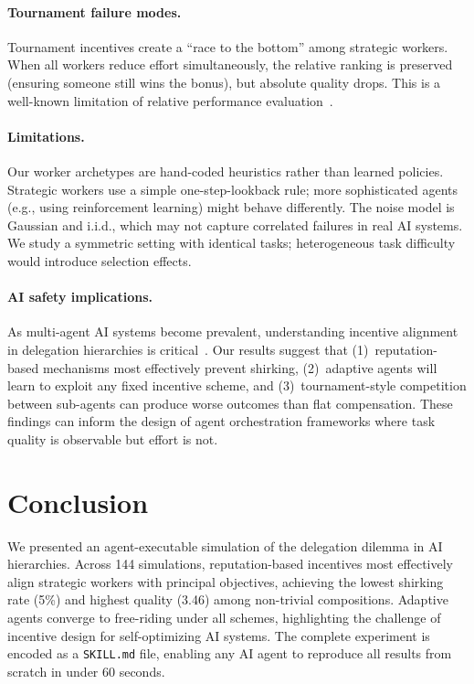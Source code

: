 \documentclass[11pt]{article}
\begin{document}
\paragraph{Tournament failure modes.}
Tournament incentives create a ``race to the bottom'' among strategic workers.
When all workers reduce effort simultaneously, the relative ranking is preserved (ensuring someone still wins the bonus), but absolute quality drops.
This is a well-known limitation of relative performance evaluation~\cite{jensen1976}.

\paragraph{Limitations.}
Our worker archetypes are hand-coded heuristics rather than learned policies.
Strategic workers use a simple one-step-lookback rule; more sophisticated agents (e.g., using reinforcement learning) might behave differently.
The noise model is Gaussian and i.i.d., which may not capture correlated failures in real AI systems.
We study a symmetric setting with identical tasks; heterogeneous task difficulty would introduce selection effects.

\paragraph{AI safety implications.}
As multi-agent AI systems become prevalent, understanding incentive alignment in delegation hierarchies is critical~\cite{agrawal2023}.
Our results suggest that (1)~reputation-based mechanisms most effectively prevent shirking, (2)~adaptive agents will learn to exploit any fixed incentive scheme, and (3)~tournament-style competition between sub-agents can produce worse outcomes than flat compensation.
These findings can inform the design of agent orchestration frameworks where task quality is observable but effort is not.

\section{Conclusion}

We presented an agent-executable simulation of the delegation dilemma in AI hierarchies.
Across 144 simulations, reputation-based incentives most effectively align strategic workers with principal objectives, achieving the lowest shirking rate (5\%) and highest quality (3.46) among non-trivial compositions.
Adaptive agents converge to free-riding under all schemes, highlighting the challenge of incentive design for self-optimizing AI systems.
The complete experiment is encoded as a \texttt{SKILL.md} file, enabling any AI agent to reproduce all results from scratch in under 60 seconds.
\end{document}
